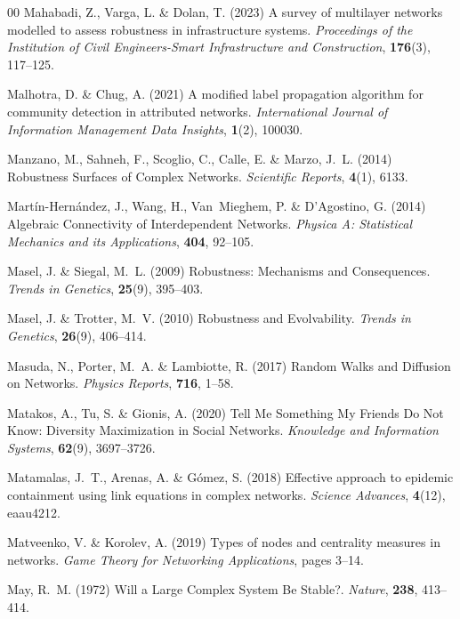\documentclass{comnet-mod}
\begin{document}
\begin{thebibliography}{00}
Mahabadi, Z., Varga, L. {\&} Dolan, T. (2023)  A survey of multilayer networks
  modelled to assess robustness in infrastructure systems. {\em {Proceedings of
  the Institution of Civil Engineers-Smart Infrastructure and Construction}},
  \textbf{176}(3), 117--125.

Malhotra, D. {\&} Chug, A. (2021)  A modified label propagation algorithm for
  community detection in attributed networks. {\em {International Journal of
  Information Management Data Insights}}, \textbf{1}(2), 100030.

Manzano, M., Sahneh, F., Scoglio, C., Calle, E. {\&} Marzo, J.~L. (2014)
  {Robustness Surfaces of Complex Networks}. {\em {Scientific Reports}},
  \textbf{4}(1), 6133.

{Mart{\'i}n-Hern{\'a}ndez}, J., Wang, H., Van~Mieghem, P. {\&} D'Agostino, G.
  (2014)  {Algebraic Connectivity of Interdependent Networks}. {\em {Physica A:
  Statistical Mechanics and its Applications}}, \textbf{404}, 92--105.

Masel, J. {\&} Siegal, M.~L. (2009)  {Robustness: {{Mechanisms}} and
  Consequences}. {\em {Trends in Genetics}}, \textbf{25}(9), 395--403.

Masel, J. {\&} Trotter, M.~V. (2010)  {Robustness and Evolvability}. {\em
  {Trends in Genetics}}, \textbf{26}(9), 406--414.

Masuda, N., Porter, M.~A. {\&} Lambiotte, R. (2017)  {Random Walks and
  Diffusion on Networks}. {\em {Physics Reports}}, \textbf{716}, 1--58.

Matakos, A., Tu, S. {\&} Gionis, A. (2020)  {Tell Me Something My Friends Do
  Not Know: {{Diversity}} Maximization in Social Networks}. {\em {Knowledge and
  Information Systems}}, \textbf{62}(9), 3697--3726.

Matamalas, J.~T., Arenas, A. {\&} G{\'o}mez, S. (2018)  Effective approach to
  epidemic containment using link equations in complex networks. {\em {Science
  Advances}}, \textbf{4}(12), eaau4212.

Matveenko, V. {\&} Korolev, A. (2019)  Types of nodes and centrality measures
  in networks. {\em {Game Theory for Networking Applications}}, pages 3--14.

May, R.~M. (1972)  {Will a Large Complex System Be Stable?}. {\em {Nature}},
  \textbf{238}, 413--414.


\end{thebibliography}
\end{document}
